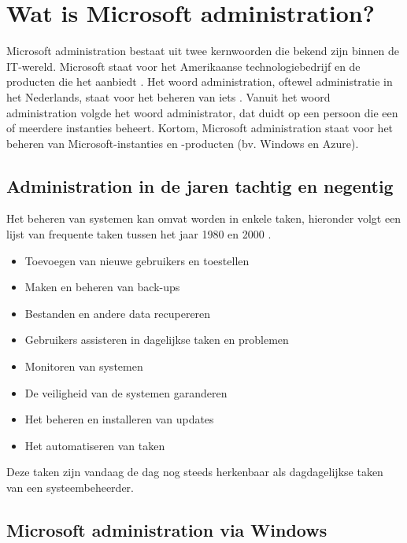 \section{Wat is Microsoft administration?}


Microsoft administration bestaat uit twee kernwoorden die bekend zijn binnen de \ac{IT}-wereld. Microsoft staat voor het Amerikaanse technologiebedrijf en de producten die het aanbiedt \autocite{Warner2019}. Het woord administration, oftewel administratie in het Nederlands, staat voor het beheren van iets \autocite{Burgess2003}. Vanuit het woord administration volgde het woord administrator, dat duidt op een persoon die een of meerdere instanties beheert. Kortom, Microsoft administration staat voor het beheren van Microsoft-instanties en -producten (bv. Windows en Azure). 

\subsection{Administration in de jaren tachtig en negentig}


Het beheren van systemen kan omvat worden in enkele taken, hieronder volgt een lijst van frequente taken tussen het jaar 1980 en 2000 \autocite{Frisch2002}.

\begin{itemize}
    \item Toevoegen van nieuwe gebruikers en toestellen
    \item Maken en beheren van back-ups
    \item Bestanden en andere data recupereren
    \item Gebruikers assisteren in dagelijkse taken en problemen
    \item Monitoren van systemen
    \item De veiligheid van de systemen garanderen
    \item Het beheren en installeren van updates
    \item Het automatiseren van taken
\end{itemize}

Deze taken zijn vandaag de dag nog steeds herkenbaar als dagdagelijkse taken van een systeembeheerder. 

\subsection{Microsoft administration via Windows}

